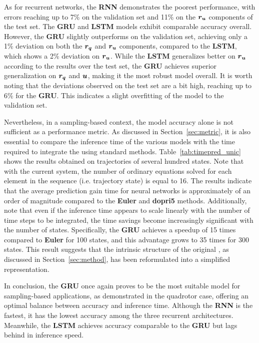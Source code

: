 As for recurrent networks, the \textbf{RNN} demonstrates the poorest performance, with errors reaching up to 7\% on the validation set and 11\% on the $\boldsymbol{r_u}$ components of the test set.
The \textbf{GRU} and \textbf{LSTM} models exhibit comparable accuracy overall. 
However, the \textbf{GRU} slightly outperforms on the validation set, achieving only a 1\% deviation on both the $\boldsymbol{r_q}$ and $\boldsymbol{r_u}$ components, compared to the \textbf{LSTM}, which shows a 2\% deviation on $\boldsymbol{r_u}$.
While the \textbf{LSTM} generalizes better on $\boldsymbol{r_u}$ according to the results over the test set, the \textbf{GRU} achieves superior generalization on $\boldsymbol{r_q}$ and $\boldsymbol{u}$, making it the most robust model overall.
It is worth noting that the deviations observed on the test set are a bit high, reaching up to 6\% for the \textbf{GRU}. 
This indicates a slight overfitting of the model to the validation set.

Nevertheless, in a sampling-based context, the model accuracy alone is not sufficient as a performance metric.
As discussed in Section~\ref{sec:metric}, it is also essential to compare the inference time of the various models with the time required to integrate the  using standard methods.
Table~\ref{tab:timepred_unic} shows the results obtained on trajectories of several hundred states. 
Note that with the current system, the number of ordinary equations solved for each element in the sequence (i.e. trajectory state) is equal to 16.
The results indicate that the average prediction gain time for neural networks is approximately of an order of magnitude compared to the \textbf{Euler} and \textbf{dopri5} methods. 
Additionally, note that even if the inference time appears to scale linearly with the number of time steps to be integrated, the time savings become increasingly significant with the number of states. 
Specifically, the \textbf{GRU} achieves a speedup of 15 times compared to \textbf{Euler} for 100 states, and this advantage grows to 35 times for 300 states.
This result suggests that the intrinsic structure of the original , as discussed in Section~\ref{sec:method}, has been reformulated into a simplified representation.

In conclusion, the \textbf{GRU} once again proves to be the most suitable model for sampling-based applications, as demonstrated in the quadrotor case, offering an optimal balance between accuracy and inference time. 
Although the \textbf{RNN} is the fastest, it has the lowest accuracy among the three recurrent architectures. 
Meanwhile, the \textbf{LSTM} achieves accuracy comparable to the \textbf{GRU} but lags behind in inference speed.

